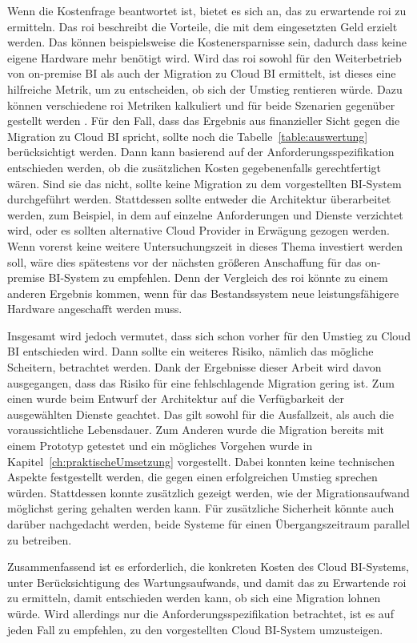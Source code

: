Wenn die Kostenfrage beantwortet ist, bietet es sich an, das zu erwartende \ac{roi} zu ermitteln. Das \ac{roi} beschreibt die Vorteile, die mit dem eingesetzten Geld erzielt werden. Das können beispielsweise die Kostenersparnisse sein, dadurch dass keine eigene Hardware mehr benötigt wird. Wird das \ac{roi} sowohl für den Weiterbetrieb von on-premise BI als auch der Migration zu Cloud BI ermittelt, ist dieses eine hilfreiche Metrik, um zu entscheiden, ob sich der Umstieg rentieren würde. Dazu können verschiedene \ac{roi} Metriken kalkuliert und für beide Szenarien gegenüber gestellt werden \cite{menon_business_2012}. Für den Fall, dass das Ergebnis aus finanzieller Sicht gegen die Migration zu Cloud BI spricht, sollte noch die Tabelle~\ref{table:auswertung} berücksichtigt werden. Dann kann basierend auf der Anforderungsspezifikation entschieden werden, ob die zusätzlichen Kosten gegebenenfalls gerechtfertigt wären. Sind sie das nicht, sollte keine Migration zu dem vorgestellten BI-System durchgeführt werden. Stattdessen sollte entweder die Architektur überarbeitet werden, zum Beispiel, in dem auf einzelne Anforderungen und Dienste verzichtet wird, oder es sollten alternative Cloud Provider in Erwägung gezogen werden. Wenn vorerst keine weitere Untersuchungszeit in dieses Thema investiert werden soll, wäre dies spätestens vor der nächsten größeren Anschaffung für das on-premise BI-System zu empfehlen. Denn der Vergleich des \ac{roi} könnte zu einem anderen Ergebnis kommen, wenn für das Bestandssystem neue leistungsfähigere Hardware angeschafft werden muss.

Insgesamt wird jedoch vermutet, dass sich schon vorher für den Umstieg zu Cloud BI entschieden wird. Dann sollte ein weiteres Risiko, nämlich das mögliche Scheitern, betrachtet werden. Dank der Ergebnisse dieser Arbeit wird davon ausgegangen, dass das Risiko für eine fehlschlagende Migration gering ist. Zum einen wurde beim Entwurf der Architektur auf die Verfügbarkeit der ausgewählten Dienste geachtet. Das gilt sowohl für die Ausfallzeit, als auch die voraussichtliche Lebensdauer. Zum Anderen wurde die Migration bereits mit einem Prototyp getestet und ein mögliches Vorgehen wurde in Kapitel~\ref{ch:praktischeUmsetzung} vorgestellt. Dabei konnten keine technischen Aspekte festgestellt werden, die gegen einen erfolgreichen Umstieg sprechen würden. Stattdessen konnte zusätzlich gezeigt werden, wie der Migrationsaufwand möglichst gering gehalten werden kann. Für zusätzliche Sicherheit könnte auch darüber nachgedacht werden, beide Systeme für einen Übergangszeitraum parallel zu betreiben. 
 
 Zusammenfassend ist es erforderlich, die konkreten Kosten des Cloud BI-Systems, unter Berücksichtigung des Wartungsaufwands, und damit das zu Erwartende \ac{roi} zu ermitteln, damit entschieden werden kann, ob sich eine Migration lohnen würde. Wird allerdings nur die Anforderungsspezifikation betrachtet, ist es auf jeden Fall zu empfehlen, zu den vorgestellten Cloud BI-System umzusteigen.
